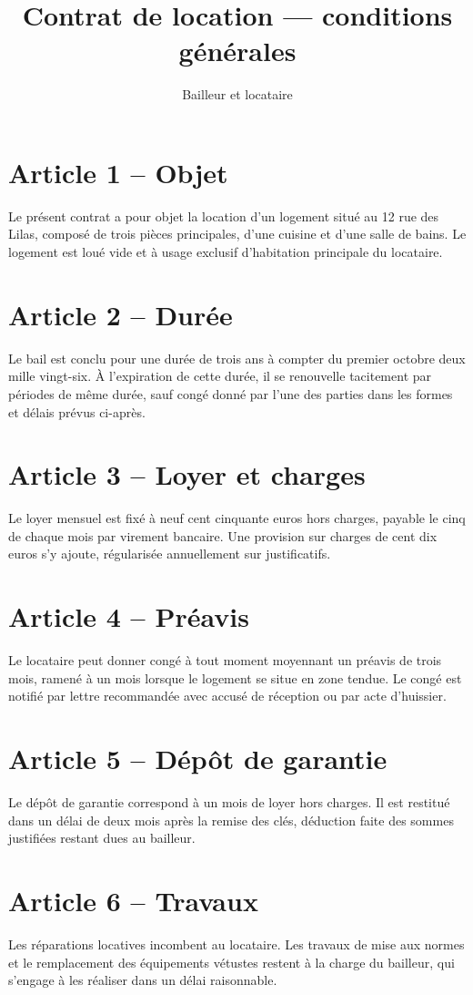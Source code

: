 \documentclass[10pt,twocolumn]{article}
\begin{document}
\title{Contrat de location — conditions générales}
\author{Bailleur et locataire}
\date{}
\maketitle
\section*{Article 1 -- Objet}
Le présent contrat a pour objet la location d'un logement situé au 12 rue des Lilas, composé de trois pièces principales, d'une cuisine et d'une salle de bains. Le logement est loué vide et à usage exclusif d'habitation principale du locataire.
\section*{Article 2 -- Durée}
Le bail est conclu pour une durée de trois ans à compter du premier octobre deux mille vingt-six. À l'expiration de cette durée, il se renouvelle tacitement par périodes de même durée, sauf congé donné par l'une des parties dans les formes et délais prévus ci-après.
\section*{Article 3 -- Loyer et charges}
Le loyer mensuel est fixé à neuf cent cinquante euros hors charges, payable le cinq de chaque mois par virement bancaire. Une provision sur charges de cent dix euros s'y ajoute, régularisée annuellement sur justificatifs.
\section*{Article 4 -- Préavis}
Le locataire peut donner congé à tout moment moyennant un préavis de trois mois, ramené à un mois lorsque le logement se situe en zone tendue. Le congé est notifié par lettre recommandée avec accusé de réception ou par acte d'huissier.
\section*{Article 5 -- Dépôt de garantie}
Le dépôt de garantie correspond à un mois de loyer hors charges. Il est restitué dans un délai de deux mois après la remise des clés, déduction faite des sommes justifiées restant dues au bailleur.
\section*{Article 6 -- Travaux}
Les réparations locatives incombent au locataire. Les travaux de mise aux normes et le remplacement des équipements vétustes restent à la charge du bailleur, qui s'engage à les réaliser dans un délai raisonnable.
\end{document}
